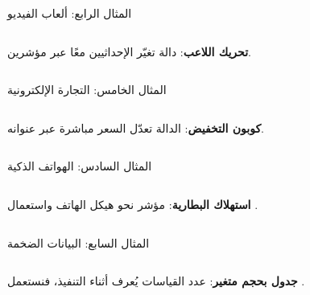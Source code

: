 \documentclass[aspectratio=169, 11pt, t, xcolor={table}]{beamer}
\begin{document}
\begin{frame}[t]{المثال الرابع: ألعاب الفيديو}
    \begin{columns}[T]
        {\small \textbf{تحريك اللاعب}: دالة تغيّر الإحداثيين معًا عبر مؤشرين.\par}
        \vspace{0.3cm}
    \end{columns}
\end{frame}

\begin{frame}[t]{المثال الخامس: التجارة الإلكترونية}
    \begin{columns}[T]
        {\small \textbf{كوبون التخفيض}: الدالة تعدّل السعر مباشرة عبر عنوانه.\par}
        \vspace{0.3cm}
    \end{columns}
\end{frame}

\begin{frame}[t]{المثال السادس: الهواتف الذكية}
    \begin{columns}[T]
        {\small \textbf{استهلاك البطارية}: مؤشر نحو هيكل الهاتف واستعمال \code{->}.\par}
        \vspace{0.3cm}
    \end{columns}
\end{frame}

\begin{frame}[t]{المثال السابع: البيانات الضخمة}
    \begin{columns}[T]
        {\small \textbf{جدول بحجم متغير}: عدد القياسات يُعرف أثناء التنفيذ، فنستعمل .\par}
        \vspace{0.3cm}
    \end{columns}
\end{frame}
\end{document}
